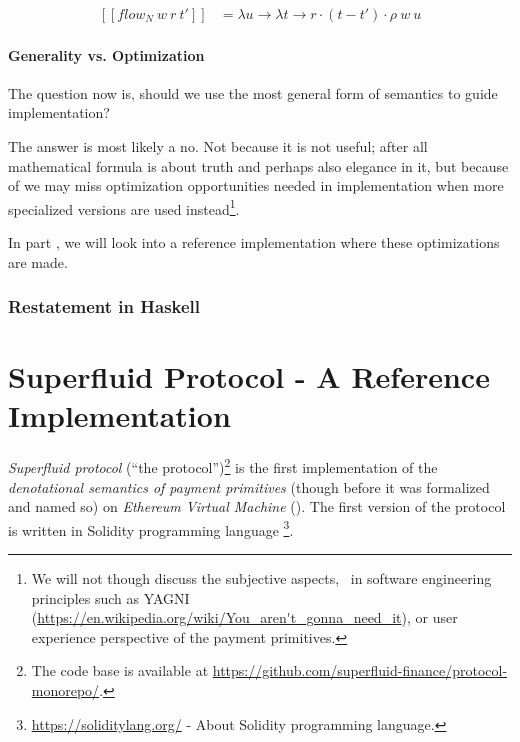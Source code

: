 \begin{equation}
    \begin{split}
        [\![flow_N\ w\ r\ t']\!] &=
        \lambda u \rightarrow \lambda t \rightarrow r \cdot (t - t') \cdot \rho\ w\ u
    \end{split}
\end{equation}

\subsection{Generality vs. Optimization}

The question now is, should we use the most general form of semantics to guide implementation?

The answer is most likely a no. Not because it is not useful; after all mathematical formula is
about truth and perhaps also elegance in it, but because of we may miss optimization opportunities
needed in implementation when more specialized versions are used instead\footnote{We will not though
discuss the subjective aspects, \eg\ in software engineering principles such as YAGNI
(\url{https://en.wikipedia.org/wiki/You_aren't_gonna_need_it}), or user experience perspective of
the payment primitives.}.

In part \ref{part:sf}, we will look into a reference implementation where these optimizations are
made.

\section{Restatement in Haskell}



\part{Superfluid Protocol - A Reference Implementation}\label{part:sf}

\textit{Superfluid protocol} (``the protocol'')\footnote{The code base is available
at \url{https://github.com/superfluid-finance/protocol-monorepo/}.} is the first implementation of
the \textit{denotational semantics of payment primitives} (though before it was formalized and named
so) on \textit{Ethereum Virtual Machine} (\cite{wood2014ethereum}). The first version of the protocol
is written in Solidity programming language \footnote{\url{https://soliditylang.org/} - About
Solidity programming language.}.

